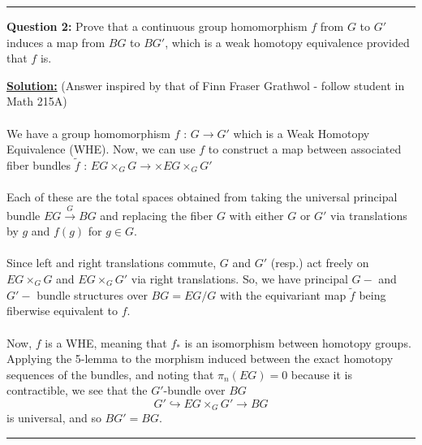 \documentclass[11pt]{article}
\begin{document}
\vskip 0.5cm
\hrule
\pagebreak



\begin{bluebox}
  \textbf{Question 2:} Prove that a continuous group homomorphism $f$ from $G$ to $G'$ induces a map from $BG$ to $BG'$, which is a weak homotopy equivalence provided that $f$ is.
\end{bluebox}

\vskip 0.5cm
\textbf{\underline{Solution:}} (Answer inspired by that of Finn Fraser Grathwol - follow student in Math 215A)
\\
\\
We have a group homomorphism $f \text{ : } G \rightarrow G'$ which is a Weak Homotopy Equivalence (WHE). Now, we can use $f$ to construct a map between associated fiber bundles $\tilde{f} \text{ : } EG \times_{G} G \rightarrow \times EG \times_G G'$
\\
\\
Each of these are the total spaces obtained from taking the universal principal bundle $EG \xrightarrow{G} BG$ and replacing the fiber $G$ with either $G$ or $G'$ via translations by $g$ and $f(g)$ for $g \in G$.
\\
\\
Since left and right translations commute, $G$ and $G'$ (resp.) act freely on $EG \times_G G$ and $EG \times_G G'$ via right translations. So, we have principal $G-$ and $G'-$ bundle structures over $BG = EG/G$ with the equivariant map $\tilde{f}$ being fiberwise equivalent to $f$.
\\
\\
Now, $f$ is a WHE, meaning that $f_*$ is an isomorphism between homotopy groups. Applying the 5-lemma to the morphism induced between the exact homotopy sequences of the bundles, and noting that $\pi_n(EG) = 0$ because it is contractible, we see that the $G'$-bundle over $BG$ $$ G' \hookrightarrow EG \times_G G' \rightarrow BG $$ is universal, and so $BG' = BG$.



\vskip 0.5cm
\hrule
\pagebreak
\end{document}
